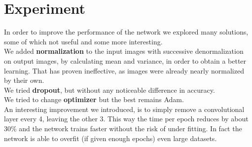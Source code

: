 \documentclass[11pt, a4paper]{article}
\begin{document}
	\section{Experiment} %
	In order to improve the performance of the network we explored many solutions, some of which not useful and some more interesting.\\
	We added \textbf{normalization} to the input images with successive denormalization on output images, by calculating mean and variance, in order to obtain a better learning. That has proven ineffective, as images were already nearly normalized by their own. \\
	We tried \textbf{dropout}, but without any noticeable difference in accuracy.\\
	We tried to change \textbf{optimizer} but the best remains Adam.\\
	An interesting improvement we introduced, is to simply remove a convolutional layer every 4, leaving the other 3. This way the time per epoch reduces by about 30\% and the network trains faster without the risk of under fitting. In fact the network is able to overfit (if given enough epochs) even large datasets.
	
\end{document}
